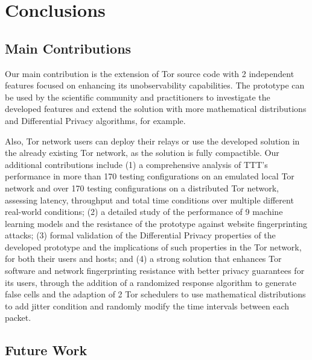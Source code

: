 
%

\chapter{Conclusions}\label{cha:conclusions}

\section{Main Contributions}\label{sec:main_conclusions}

Our main contribution is the extension of Tor source code with 2 independent features focused on enhancing its unobservability capabilities. The prototype can be used by the scientific community and practitioners to investigate the developed features and extend the solution with more mathematical distributions and Differential Privacy algorithms, for example. 

Also, Tor network users can deploy their relays or use the developed solution in the already existing Tor network, as the solution is fully compactible. Our additional contributions include (1) a comprehensive analysis of TTT's performance in more than 170 testing configurations on an emulated local Tor network and over 170 testing configurations on a distributed Tor network, assessing latency, throughput and total time conditions over multiple different real-world conditions; (2) a detailed study of the performance of 9 machine learning models and the resistance of the prototype against website fingerprinting attacks; (3) formal validation of the Differential Privacy properties of the developed prototype and the implications of such properties in the Tor network, for both their users and hosts; and (4) a strong solution that enhances Tor software and network fingerprinting resistance with better privacy guarantees for its users, through the addition of a randomized response algorithm to generate false cells and the adaption of 2 Tor schedulers to use mathematical distributions to add jitter condition and randomly modify the time intervals between each packet.

\section{Future Work}\label{sec:future_work}

